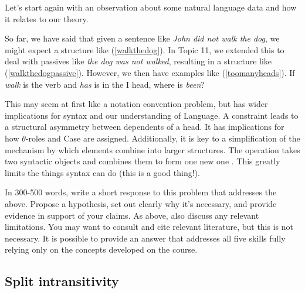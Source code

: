 \documentclass{article}
\begin{document}
Let's start again with an observation about some natural language data and how it relates to our theory.
\begin{exe}
\end{exe}
So far, we have said that given a sentence like \emph{John did not walk the dog}, we might expect a structure like (\ref{walkthedog}).
In Topic 11, we extended this to deal with passives like \emph{the dog was not walked}, resulting in a structure like (\ref{walkthedogpassive}).
However, we then have examples like (\ref{toomanyheads}).
If \emph{walk} is the verb and \emph{has} is in the I head, where is \emph{been}?

This may seem at first like a notation convention problem, but  has wider implications for syntax and our understanding of Language.
A  constraint leads to a structural asymmetry between dependents of a head.
It has implications for how $\theta{}$-roles and Case are assigned.
Additionally, it is key to a simplification of the mechanism by which elements combine into larger structures.
The operation  takes two syntactic objects and combines them to form one new one \citep{chomsky_minimalist_1995}.
This greatly limits the things syntax can do (this is a good thing!).

In 300-500 words, write a short response to this problem that addresses the  above.
Propose a hypothesis, set out clearly why it's necessary, and provide evidence in support of your claims.
As above, also discuss any relevant limitations.
You may want to consult and cite relevant literature, but this is not necessary.
It is possible to provide an answer that addresses all five skills fully relying only on the concepts developed on the course.

\subsection{Split intransitivity}
\end{document}
